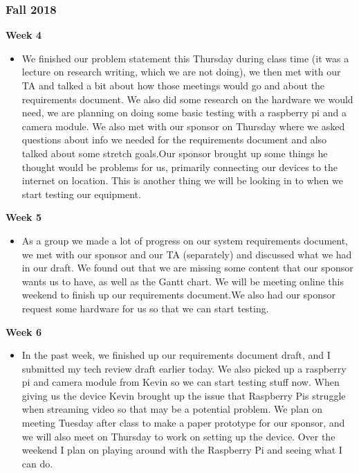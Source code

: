\subsubsection{Fall 2018}
        \textbf{Week 4}
        \begin{itemize}
            \item We finished our problem statement this Thursday during class time (it was a lecture on research writing, which we are not doing), we then met with our TA and talked a bit about how those meetings would go and about the requirements document. We also did some research on the hardware we would need, we are planning on doing some basic testing with a raspberry pi and a camera module. We also met with our sponsor on Thursday where we asked questions about info we needed for the requirements document and also talked about some stretch goals.Our sponsor brought up some things he thought would be problems for us, primarily connecting our devices to the internet on location. This is another thing we will be looking in to when we start testing our equipment.
        \end{itemize}
         \textbf{Week 5}
        \begin{itemize}
            \item As a group we made a lot of progress on our system requirements document, we met with our sponsor and our TA (separately) and discussed what we had in our draft. We found out that we are missing some content that our sponsor wants us to have, as well as the Gantt chart. We will be meeting online this weekend to finish up our requirements document.We also had our sponsor request some hardware for us so that we can start testing.
        \end{itemize}
        \newpage
        \textbf{Week 6}
        \begin{itemize}
            \item In the past week, we finished up our requirements document draft, and I submitted my tech review draft earlier today. We also picked up a raspberry pi and camera module from Kevin so we can start testing stuff now. When giving us the device Kevin brought up the issue that Raspberry Pis struggle when streaming video so that may be a potential problem. We plan on meeting Tuesday after class to make a paper prototype for our sponsor, and we will also meet on Thursday to work on setting up the device. Over the weekend I plan on playing around with the Raspberry Pi and seeing what I can do.
        \end{itemize}
